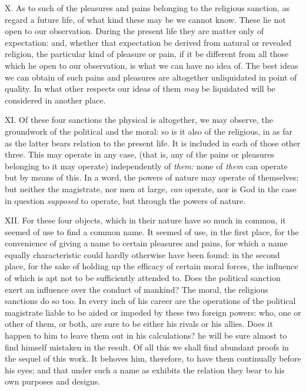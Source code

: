 \documentclass[12pt]{report}
\begin{document}
X. As to such of the pleasures and pains belonging to the religious
sanction, as regard a future life, of what kind these may be we cannot
know. These lie not open to our observation. During the present life
they are matter only of expectation: and, whether that expectation be
derived from natural or revealed religion, the particular kind of
pleasure or pain, if it be different from all those which he open to our
observation, is what we can have no idea of. The best ideas we can
obtain of such pains and pleasures are altogether unliquidated in point
of quality. In what other respects our ideas of them \emph{may} be
liquidated will be considered in another place.

XI. Of these four sanctions the physical is altogether, we may observe,
the groundwork of the political and the moral: so is it also of the
religious, in as far as the latter bears relation to the present life.
It is included in each of those other three. This may operate in any
case, (that is, any of the pains or pleasures belonging to it may
operate) independently of \emph{them:} none of \emph{them} can operate
but by means of this. In a word, the powers of nature may operate of
themselves; but neither the magistrate, nor men at large, \emph{can}
operate, nor is God in the case in question \emph{supposed} to operate,
but through the powers of nature.

XII. For these four objects, which in their nature have so much in
common, it seemed of use to find a common name. It seemed of use, in the
first place, for the convenience of giving a name to certain pleasures
and pains, for which a name equally characteristic could hardly
otherwise have been found: in the second place, for the sake of holding
up the efficacy of certain moral forces, the influence of which is apt
not to be sufficiently attended to. Does the political sanction exert an
influence over the conduct of mankind? The moral, the religious
sanctions do so too. In every inch of his career are the operations of
the political magistrate liable to be aided or impeded by these two
foreign powers: who, one or other of them, or both, are sure to be
either his rivals or his allies. Does it happen to him to leave them out
in his calculations? he will be sure almost to find himself mistaken in
the result. Of all this we shall find abundant proofs in the sequel of
this work. It behoves him, therefore, to have them continually before
his eyes; and that under such a name as exhibits the relation they bear
to his own purposes and designs.
\end{document}
